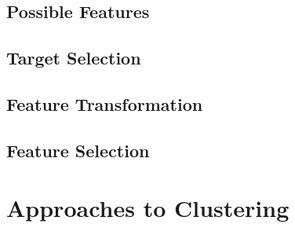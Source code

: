 \subsection{Possible Features}
\label{subsec:chap6-feature-select}

\subsection{Target Selection}
\label{subsec:chap6-feature-select}

\subsection{Feature Transformation}
\label{subsec:chap6-feature-transform}

\subsection{Feature Selection}
\label{subsec:chap6-litmus}


\section{Approaches to Clustering}
\label{sec:chap6-cluster}

